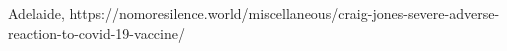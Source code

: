           {
            Adelaide, 
          }
          {
          }
          {
          }
          {
          }
          {
          }
          {
            https://nomoresilence.world/miscellaneous/craig-jones-severe-adverse-reaction-to-covid-19-vaccine/
          }

